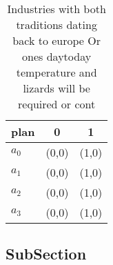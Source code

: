 \documentclass[a4paper]{article}
\begin{document}
\begin{table}
\begin{adjustbox}{width=0.5\columnwidth}
\begin{tabular}{|l|l|l|}
\hline
\textbf{plan} & \multicolumn{1}{c|}{\textbf{0}} & \multicolumn{1}{c|}{\textbf{1}} \\ \hline
\textbf{$a_0$}  & (0,0) & (1,0) \\ \hline
\textbf{$a_1$}  & (0,0) & (1,0) \\ \hline
\textbf{$a_2$}  & (0,0) & (1,0) \\ \hline
\textbf{$a_3$}  & (0,0) & (1,0) \\ \hline
\end{tabular}
\end{adjustbox}
\caption{Industries with both traditions dating back to europe Or ones daytoday temperature and lizards will be required or cont
}
\end{table}

\subsection{SubSection}
\end{document}
